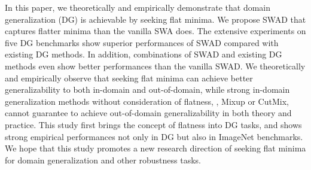 

In this paper, we theoretically and empirically demonstrate that domain generalization (DG) is achievable by seeking flat minima.
We propose SWAD that captures flatter minima than the vanilla SWA does.
The extensive experiments on five DG benchmarks show superior performances of SWAD compared with existing DG methods.
In addition, combinations of SWAD and existing DG methods even show better performances than the vanilla SWAD.
We theoretically and empirically observe that seeking flat minima can achieve better generalizability to both in-domain and out-of-domain, while strong in-domain generalization methods without consideration of flatness, \eg, Mixup or CutMix, cannot guarantee to achieve out-of-domain generalizability in both theory and practice.
This study first brings the concept of flatness into DG tasks, and shows strong empirical performances not only in DG but also in ImageNet benchmarks.
We hope that this study promotes a new research direction of seeking flat minima for domain generalization and other robustness tasks.

